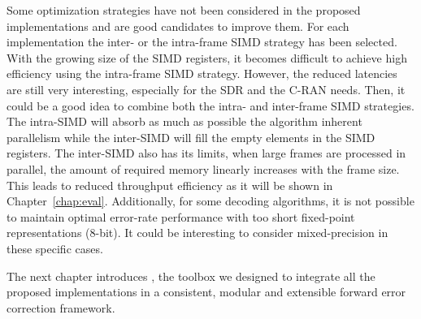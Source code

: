 Some optimization strategies have not been considered in the proposed
implementations and are good candidates to improve them. For each implementation
the inter- or the intra-frame SIMD strategy has been selected. With the growing
size of the SIMD registers, it becomes difficult to achieve high efficiency
using the intra-frame SIMD strategy. However, the reduced latencies are still
very interesting, especially for the SDR and the C-RAN needs. Then, it could
be a good idea to combine both the intra- and inter-frame SIMD strategies. The
intra-SIMD will absorb as much as possible the algorithm inherent parallelism
while the inter-SIMD will fill the empty elements in the SIMD registers. The
inter-SIMD also has its limits, when large frames are processed in parallel, the
amount of required memory linearly increases with the frame size. This leads to
reduced throughput efficiency as it will be shown in Chapter~\ref{chap:eval}.
Additionally, for some decoding algorithms, it is not possible to maintain
optimal error-rate performance with too short fixed-point representations
(8-bit). It could be interesting to consider mixed-precision in these specific
cases.

The next chapter introduces \AFFECT, the toolbox we designed to integrate all
the proposed implementations in a consistent, modular and extensible forward
error correction framework.
